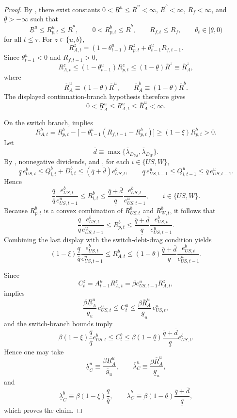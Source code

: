 \documentclass[12pt]{article}
\theoremstyle{plain}
\begin{document}
\begin{proof}
By , there exist constants
$0<\underline R^u\le \overline R^u<\infty$, $\overline R^b<\infty$,
$\overline R_f<\infty$, and $\underline\theta>-\infty$ such that
\[
\underline R^u\le R_{p,t}^u\le \overline R^u,
\qquad
0<R_{p,t}^b\le \overline R^b,
\qquad
R_{f,t}\le \overline R_f,
\qquad
\theta_t\in[\underline\theta,0)
\]
for all $t\le\tau$.
For $z\in\{u,b\}$,
\[
R_{A,t}^z=(1-\theta_{t-1}^u)R_{p,t}^z+\theta_{t-1}^u R_{f,t-1}.
\]
Since $\theta_{t-1}^u<0$ and $R_{f,t-1}>0$,
\[
R_{A,t}^z
\le
(1-\theta_{t-1}^u)R_{p,t}^z
\le
(1-\underline\theta)\overline R^z
\equiv
\overline R_A^z,
\]
where
\[
\overline R_A^u\equiv (1-\underline\theta)\overline R^u,
\qquad
\overline R_A^b\equiv (1-\underline\theta)\overline R^b.
\]
The displayed continuation-branch hypothesis therefore gives
\[
0<\underline R_A^u\le R_{A,t}^u\le \overline R_A^u<\infty.
\]

On the switch branch,  implies
\[
R_{A,t}^b
=
R_{p,t}^b-\bigl[-\theta_{t-1}^u(R_{f,t-1}-R_{p,t}^b)\bigr]
\ge
(1-\xi)R_{p,t}^b
>
0.
\]
Let
\[
\overline d\equiv \max\{\overline\lambda_{D_{US}},\overline\lambda_{D_W}\}.
\]
By , nonnegative dividends, and , for each $i\in\{US,W\}$,
\[
\underline q\,e_{US,t}^b
\le
Q_{i,t}^b+D_{i,t}^b
\le
(\overline q+\overline d)e_{US,t}^b,
\qquad
\underline q\,e_{US,t-1}^u
\le
Q_{i,t-1}^u
\le
\overline q\,e_{US,t-1}^u.
\]
Hence
\[
\frac{\underline q}{\overline q}\frac{e_{US,t}^b}{e_{US,t-1}^u}
\le
R_{i,t}^b
\le
\frac{\overline q+\overline d}{\underline q}\frac{e_{US,t}^b}{e_{US,t-1}^u},
\qquad i\in\{US,W\}.
\]
Because $R_{p,t}^b$ is a convex combination of $R_{US,t}^b$ and $R_{W,t}^b$, it follows that
\[
\frac{\underline q}{\overline q}\frac{e_{US,t}^b}{e_{US,t-1}^u}
\le
R_{p,t}^b
\le
\frac{\overline q+\overline d}{\underline q}\frac{e_{US,t}^b}{e_{US,t-1}^u}.
\]
Combining the last display with the switch-debt-drag condition yields
\[
(1-\xi)\frac{\underline q}{\overline q}\frac{e_{US,t}^b}{e_{US,t-1}^u}
\le
R_{A,t}^b
\le
(1-\underline\theta)\frac{\overline q+\overline d}{\underline q}\frac{e_{US,t}^b}{e_{US,t-1}^u}.
\]

Since
\[
C_t^z=A_{t-1}^uR_{A,t}^z=\beta e_{US,t-1}^uR_{A,t}^z,
\]
 implies
\[
\frac{\beta\underline R_A^u}{\overline g_u}\,e_{US,t}^u
\le
C_t^u
\le
\frac{\beta\overline R_A^u}{\underline g_u}\,e_{US,t}^u,
\]
and the switch-branch bounds imply
\[
\beta(1-\xi)\frac{\underline q}{\overline q}e_{US,t}^b
\le
C_t^b
\le
\beta(1-\underline\theta)\frac{\overline q+\overline d}{\underline q}e_{US,t}^b.
\]
Hence one may take
\[
\underline\lambda^u_C\equiv \frac{\beta\underline R_A^u}{\overline g_u},
\qquad
\overline\lambda^u_C\equiv \frac{\beta\overline R_A^u}{\underline g_u},
\]
and
\[
\underline\lambda^b_C\equiv \beta(1-\xi)\frac{\underline q}{\overline q},
\qquad
\overline\lambda^b_C\equiv \beta(1-\underline\theta)\frac{\overline q+\overline d}{\underline q},
\]
which proves the claim.
\end{proof}
\end{document}
